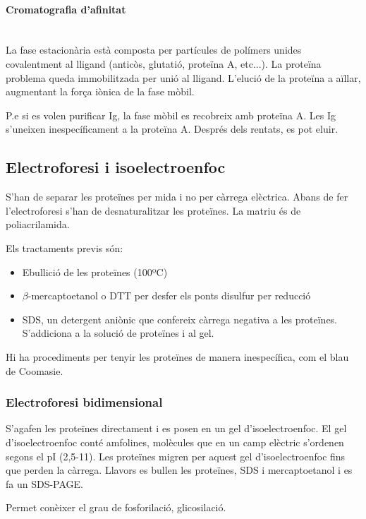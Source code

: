 \paragraph{Cromatografia d'afinitat} \hfill \\
La fase estacionària està composta per partícules de polímers unides covalentment al lligand (anticòs, glutatió, proteïna A, etc...). La proteïna problema queda immobilitzada per unió al lligand.
L'elució de la proteïna a aïllar, augmentant la força iònica de la fase mòbil.

P.e si es volen purificar Ig, la fase mòbil es recobreix amb proteïna A. Les Ig s'uneixen inespecíficament a la proteïna A. Després dels rentats, es pot eluir.



\subsection{Electroforesi i isoelectroenfoc}
\label{sec:electr-i-isoel}
S'han de separar les proteïnes per mida i no per càrrega elèctrica. Abans de fer l'electroforesi s'han de desnaturalitzar les proteïnes. La matriu és de poliacrilamida.

Els tractaments previs són:
\begin{itemize}
\item Ebullició de les proteïnes (100ºC)
\item $\beta$-mercaptoetanol o DTT per desfer els ponts disulfur per reducció
\item SDS, un detergent aniònic que confereix càrrega negativa a les proteïnes. S'addiciona a la solució de proteïnes i al gel.
\end{itemize}

Hi ha procediments per tenyir les proteïnes de manera inespecífica, com el blau de Coomasie.

\subsubsection{Electroforesi bidimensional}
\label{sec:electr-bidim}
S'agafen les proteïnes directament i es posen en un gel d'isoelectroenfoc. El gel d'isoelectroenfoc conté amfolines, molècules que en un camp elèctric s'ordenen segons el pI (2,5-11). Les proteïnes migren per aquest gel d'isoelectroenfoc fins que perden la càrrega. Llavors es bullen les proteïnes, SDS i mercaptoetanol i es fa un SDS-PAGE.

Permet conèixer el grau de fosforilació, glicosilació.


